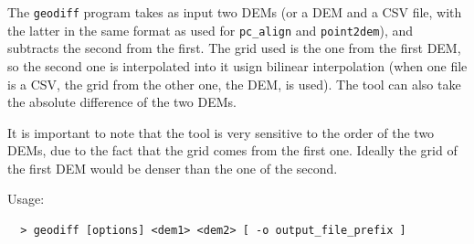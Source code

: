 The \texttt{geodiff} program takes as input two DEMs (or a DEM and a CSV file, with the latter in the same format as used for \texttt{pc\_align} and \texttt{point2dem}), and subtracts the second from the first. The grid used is the one from the first DEM, so the second one is interpolated into it usign bilinear interpolation (when one file is a CSV, the grid from the other one, the DEM, is used). The tool can also take the absolute difference of the two DEMs.

It is important to note that the tool is very sensitive to the order of
the two DEMs, due to the fact that the grid comes from the first
one. Ideally the grid of the first DEM would be denser than the one of
the second.

\medskip

Usage:
\begin{verbatim}
  > geodiff [options] <dem1> <dem2> [ -o output_file_prefix ]
\end{verbatim}

